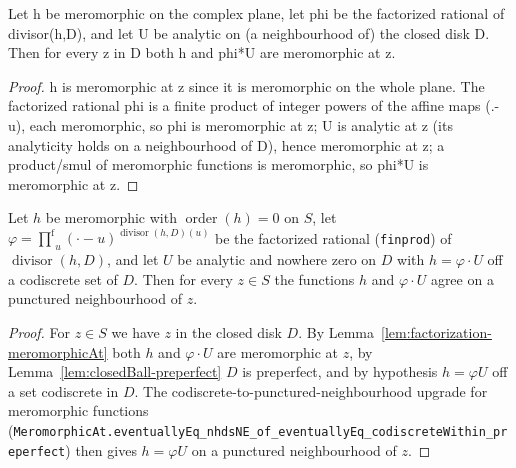 \begin{lemma}
  \label{lem:factorization-meromorphicAt}
  \leanok
  Let h be meromorphic on the complex plane, let phi be the factorized rational
  of divisor(h,D), and let U be analytic on (a neighbourhood of) the closed disk
  D. Then for every z in D both h and phi*U are meromorphic at z.
\end{lemma}
\begin{proof}
  h is meromorphic at z since it is meromorphic on the whole plane. The
  factorized rational phi is a finite product of integer powers of the affine
  maps (.-u), each meromorphic, so phi is meromorphic at z; U is analytic at z
  (its analyticity holds on a neighbourhood of D), hence meromorphic at z; a
  product/smul of meromorphic functions is meromorphic, so phi*U is meromorphic
  at z.
\end{proof}

\begin{lemma}
    \label{lem:factorization-eventuallyEq}
    \leanok
    Let $h$ be meromorphic with $\operatorname{order}(h) = 0$ on $S$, let
    $\varphi = \operatorname*{{\textstyle\prod}^{\mathrm f}}_{u}
      (\cdot-u)^{\operatorname{divisor}(h,D)(u)}$ be the factorized rational
    (\texttt{finprod}) of $\operatorname{divisor}(h,D)$, and let $U$ be analytic
    and nowhere zero on $D$ with $h = \varphi \cdot U$ off a codiscrete set of
    $D$. Then for every $z \in S$ the functions $h$ and $\varphi\cdot U$ agree on
    a punctured neighbourhood of $z$.
\end{lemma}
\begin{proof}
    For $z \in S$ we have $z$ in the closed disk $D$. By
    Lemma~\ref{lem:factorization-meromorphicAt} both $h$ and $\varphi\cdot U$ are
    meromorphic at $z$, by Lemma~\ref{lem:closedBall-preperfect} $D$ is
    preperfect, and by hypothesis $h = \varphi U$ off a set codiscrete in $D$.
    The codiscrete-to-punctured-neighbourhood upgrade for meromorphic functions
    (\texttt{MeromorphicAt.eventuallyEq\_nhdsNE\_of\_eventuallyEq\_codiscreteWithin\_preperfect})
    then gives $h = \varphi U$ on a punctured neighbourhood of $z$.
\end{proof}

